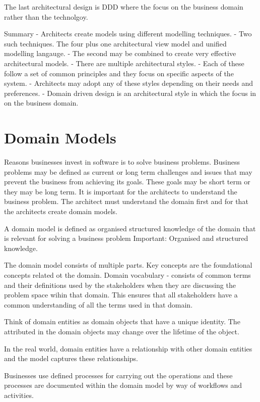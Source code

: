 \documentclass[a4paper, 11pt]{book}
\begin{document}
    The last architectural design is DDD where the focus on the business domain rather than the technolgoy.

    Summary
    - Architects create models using different modelling techniques.
    - Two such techniques.
    The four plus one architectural view model and unified modelling langauge.
    - The second may be combined to create very effective architectural models.
    - There are multiple architectural styles.
    - Each of these follow a set of common principles and they focus on specific aspects of the system.
    - Architects may adopt any of these styles depending on their needs and preferences.
    - Domain driven design is an architectural style in which the focus in on the business domain.


    \section{Domain Models}
    Reasons businesses invest in software is to solve business problems.
    Business problems may be defined as current or long term challenges and issues that may prevent the business from achieving its goals.
    These goals may be short term or they may be long term.
    It is important for the architects to understand the business problem.
    The architect must understand the domain first and for that the architects create domain models.


    A domain model is defined as organised structured knowledge of the domain that is relevant for solving a business problem
    Important: Organised and structured knowledge.

    The domain model consists of multiple parts.
    Key concepts are the foundational concepts related ot the domain.
    Domain vocabulary - consists of common terms and their definitions used by the stakeholders when they are discussing the problem space wihin that domain.
    This ensures that all stakeholders have a common understanding of all the terms used in that domain.

    Think of domain entities as domain objects that have a unique identity.
    The attributed in the domain objects may change over the lifetime of the object.

    In the real world, domain entities have a relationship with other domain entities and the model captures these relationships.

    Businesses use defined processes for carrying out the operations and these processes are documented within the domain model by way of workflows and activities.
\end{document}
